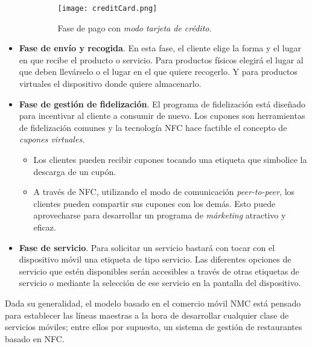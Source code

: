 \begin{itemize}
\begin{itemize}
    \begin{figure}[!h]
      \begin{center}
        \texttt{[image: creditCard.png]}
        \caption{Fase de pago con \emph{modo tarjeta de crédito}.}
        \label{fig:creditCard}
      \end{center}
    \end{figure}

    \end{itemize}
  \item \textbf{Fase de envío y recogida}. En esta fase, el cliente elige
  la forma y el lugar en que recibe el producto o servicio. Para productos
  físicos elegirá el lugar al que deben llevárselo o el lugar en el que quiere
  recogerlo. Y para productos virtuales el dispositivo donde quiere
  almacenarlo.
  \item \textbf{Fase de gestión de fidelización}. El programa de fidelización
  está diseñado para incentivar al cliente a consumir de nuevo. Los cupones son
  herramientas de fidelización comunes y la tecnología \acs{NFC} hace factible
  el concepto de \emph{cupones virtuales}.
    \begin{itemize}
    \item Los clientes pueden recibir cupones tocando una etiqueta que 
    simbolice la descarga de un cupón.
    \item A través de \acs{NFC}, utilizando el modo de comunicación
    \emph{peer-to-peer}, los clientes pueden compartir sus cupones con los
    demás. Esto puede aprovecharse para desarrollar un programa de
    \emph{márketing} atractivo y eficaz.
    \end{itemize}
  \item \textbf{Fase de servicio}. Para solicitar un servicio bastará con
  tocar con el dispositivo móvil una etiqueta de tipo servicio. Las diferentes
  opciones de servicio que estén disponibles serán accesibles a través de
  otras etiquetas de servicio o mediante la selección de ese servicio en la
  pantalla del dispositivo.
  \end{itemize}
  
  Dada su generalidad, el modelo basado en el comercio móvil \acs{NMC} está 
  pensado para establecer las líneas maestras a la hora de desarrollar 
  cualquier clase de servicios móviles; entre ellos por supuesto, un sistema
  de gestión de restaurantes basado en \acs{NFC}.

